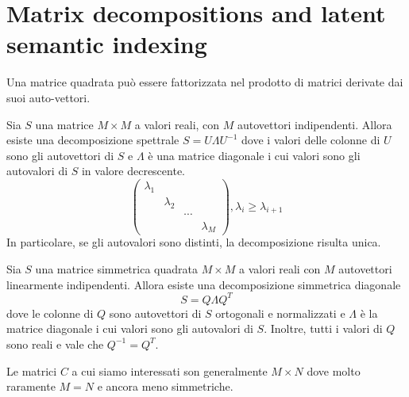 \documentclass[\main/main.tex]{subfiles}
\begin{document}
\chapter{Matrix decompositions and latent semantic indexing}
\begin{multicols}{2}
\begin{definition}
    Una matrice quadrata può essere fattorizzata nel prodotto di matrici derivate dai suoi auto-vettori.
\end{definition}
\begin{theorem}
    Sia \(S\) una matrice \(M\times M\) a valori reali, con \(M\) autovettori indipendenti. Allora esiste una decomposizione spettrale \(
        S=U \Lambda U^{-1}
    \) dove i valori delle colonne di \(U\) sono gli autovettori di \(S\) e \(\Lambda\) è una matrice diagonale i cui valori sono gli autovalori di \(S\) in valore decrescente.
    \[
        \left(\begin{array}{cccc}{\lambda_{1}} & {} & {} & {} \\ {} & {\lambda_{2}} & {} & {} \\ {} & {} & {\cdots} & {} \\ {} & {} & {} & {\lambda_{M}}\end{array}\right), \lambda_{i} \geq \lambda_{i+1}
    \]
    In particolare, se gli autovalori sono distinti, la decomposizione risulta unica.
\end{theorem}
\begin{theorem}
    Sia \(S\) una matrice simmetrica quadrata \(M\times M\) a valori reali con \(M\) autovettori linearmente indipendenti. Allora esiste una decomposizione simmetrica diagonale
    \[
        S=Q \Lambda Q^{T}
    \]
    dove le colonne di \(Q\) sono autovettori di \(S\) ortogonali e normalizzati e \(\Lambda\) è la matrice diagonale i cui valori sono gli autovalori di \(S\). Inoltre, tutti i valori di \(Q\) sono reali e vale che \(Q^{-1} = Q^T\).
\end{theorem}
\begin{observation}
    Le matrici \(C\) a cui siamo interessati son generalmente \(M \times N\) dove molto raramente \(M = N\) e ancora meno simmetriche.
\end{observation}
\end{multicols}
\end{document}
